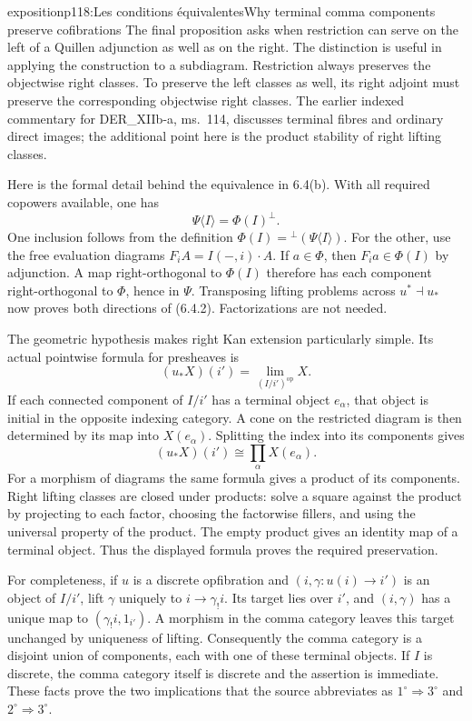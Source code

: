 \begin{dcomment}{exposition}{p118:Les conditions équivalentes}{Why terminal comma components preserve cofibrations}
The final proposition asks when restriction can serve on the left of a Quillen adjunction as well as on the right. The distinction is useful in applying the construction to a subdiagram. Restriction always preserves the objectwise right classes. To preserve the left classes as well, its right adjoint must preserve the corresponding objectwise right classes. The earlier indexed commentary for DER\_XIIb-a, ms.~114, discusses terminal fibres and ordinary direct images; the additional point here is the product stability of right lifting classes.

Here is the formal detail behind the equivalence in 6.4(b). With all required copowers available, one has
\[
 \Psi\langle I\rangle=\Phi(I)^\perp.
\]
One inclusion follows from the definition $\Phi(I)={}^\perp(\Psi\langle I\rangle)$. For the other, use the free evaluation diagrams $F_iA=I(-,i)\cdot A$. If $a\in\Phi$, then $F_ia\in\Phi(I)$ by adjunction. A map right-orthogonal to $\Phi(I)$ therefore has each component right-orthogonal to $\Phi$, hence in $\Psi$. Transposing lifting problems across $u^*\dashv u_*$ now proves both directions of (6.4.2). Factorizations are not needed.

The geometric hypothesis makes right Kan extension particularly simple. Its actual pointwise formula for presheaves is
\[
 (u_*X)(i')=\lim_{(I/i')^{\mathrm{op}}}X.
\]
If each connected component of $I/i'$ has a terminal object $e_\alpha$, that object is initial in the opposite indexing category. A cone on the restricted diagram is then determined by its map into $X(e_\alpha)$. Splitting the index into its components gives
\[
 (u_*X)(i')\cong\prod_\alpha X(e_\alpha).
\]
For a morphism of diagrams the same formula gives a product of its components. Right lifting classes are closed under products: solve a square against the product by projecting to each factor, choosing the factorwise fillers, and using the universal property of the product. The empty product gives an identity map of a terminal object. Thus the displayed formula proves the required preservation.

For completeness, if $u$ is a discrete opfibration and $(i,\gamma:u(i)\to i')$ is an object of $I/i'$, lift $\gamma$ uniquely to $i\to\gamma_!i$. Its target lies over $i'$, and $(i,\gamma)$ has a unique map to $(\gamma_!i,1_{i'})$. A morphism in the comma category leaves this target unchanged by uniqueness of lifting. Consequently the comma category is a disjoint union of components, each with one of these terminal objects. If $I$ is discrete, the comma category itself is discrete and the assertion is immediate. These facts prove the two implications that the source abbreviates as $1^\circ\Rightarrow3^\circ$ and $2^\circ\Rightarrow3^\circ$.
\end{dcomment}

